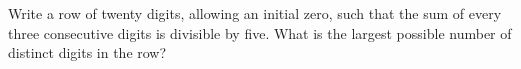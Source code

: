 Write a row of twenty digits, allowing an initial zero, such that the sum of every three consecutive digits is divisible by five. What is the largest possible number of distinct digits in the row?
